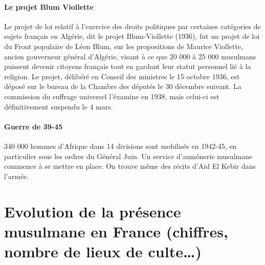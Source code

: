 \paragraph{Le projet Blum Viollette}
Le projet de loi relatif à l'exercice des droits politiques par certaines catégories de sujets français en Algérie, dit le projet Blum-Viollette (1936), fut un projet de loi du Front populaire de Léon Blum, sur les propositions de Maurice Viollette, ancien gouverneur général d'Algérie, visant à ce que 20 000 à 25 000 musulmans puissent devenir citoyens français tout en gardant leur statut personnel lié à la religion. Le projet, délibéré en Conseil des ministres le 15 octobre 1936, est déposé sur le bureau de la Chambre des députés le 30 décembre suivant. La commission du suffrage universel l'éxamine en 1938, mais celui-ci est définitivement suspendu le 4 mars.

\paragraph{Guerre de 39-45}
340 000 hommes d'Afrique dans 14 divisions sont mobilisés en 1942-45, en particulier sous les ordres du Général Juin. Un service d'aumônerie musulmane commence à se mettre en place. On trouve même des récits d'Aid El Kebir dans l'armée. 




\section{Evolution de la présence musulmane en France (chiffres, nombre de lieux de culte…)}

